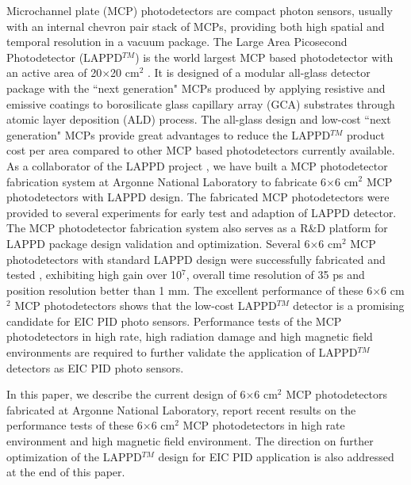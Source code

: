 \documentclass[preprint,5p]{elsarticle}
\begin{document}
Microchannel plate (MCP) photodetectors are compact photon sensors, usually 
with an internal chevron pair stack of MCPs, providing both high spatial and 
temporal resolution in a vacuum package. The Large Area Picosecond 
Photodetector (LAPPD$^{TM}$) is the world largest MCP based photodetector with 
an active area of 20$\times$20 cm$^2$ \cite{LAPPD}. It is designed of a modular 
all-glass detector package with the ``next generation" MCPs produced by 
applying resistive and emissive coatings to borosilicate glass capillary array 
(GCA) substrates through atomic layer deposition (ALD) process. The all-glass 
design and low-cost ``next generation" MCPs provide great advantages to reduce 
the LAPPD$^{TM}$ product cost per area compared to other MCP based 
photodetectors currently available. As a collaborator of the LAPPD project 
\cite{LAPPD2}, we have built a MCP photodetector fabrication system 
\cite{LAPPD-ANL} at Argonne National Laboratory to fabricate 6$\times$6 cm$^2$ 
MCP photodetectors with LAPPD design.  The fabricated MCP photodetectors were 
provided to several experiments for early test and adaption of LAPPD detector.  
The MCP photodetector fabrication system also serves as a R{\&}D platform for 
LAPPD package design validation and optimization. Several 6$\times$6 cm$^2$ MCP 
photodetectors with standard LAPPD design were successfully fabricated and 
tested \cite{ANL-MCPs,Wang-MCPs,Wang-MCPs}, exhibiting high gain over 10$^7$, 
overall time resolution of 35 ps and position resolution better than 1 mm.  The 
excellent performance of these 6$\times$6 cm$^2$ MCP photodetectors shows that 
the low-cost LAPPD$^{TM}$ detector is a promising candidate for EIC PID photo 
sensors.  Performance tests of the MCP photodetectors in high rate, high 
radiation damage and high magnetic field environments are required to further 
validate the application of LAPPD$^{TM}$ detectors as EIC PID photo sensors. 

In this paper, we describe the current design of 6$\times$6 cm$^2$ MCP 
photodetectors fabricated at Argonne National Laboratory, report recent results 
on the performance tests of these 6$\times$6 cm$^2$ MCP photodetectors in high 
rate environment and high magnetic field environment. The direction on further 
optimization of the LAPPD$^{TM}$ design for EIC PID application is also 
addressed at the end of this paper.
\end{document}
